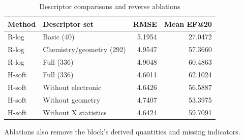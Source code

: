 \par
\begin{table}[H]
\centering
\begin{threeparttable}
\caption{Descriptor comparisons and reverse ablations}\label{tab:features}
\begin{tabularx}{\linewidth}{@{}l X r r@{}}
\toprule
Method & Descriptor set & RMSE & Mean EF@20\\
\midrule
R-log & Basic (40) & 5.1954 & 27.0472\\
R-log & Chemistry/geometry (292) & 4.9547 & 57.3660\\
R-log & Full (336) & 4.9048 & 60.4863\\
H-soft & Full (336) & 4.6011 & 62.1024\\
H-soft & Without electronic & 4.6426 & 56.5887\\
H-soft & Without geometry & 4.7407 & 53.3975\\
H-soft & Without X statistics & 4.6424 & 59.7091\\
\bottomrule
\end{tabularx}
\begin{tablenotes}[flushleft]
\item[] Ablations also remove the block's derived quantities and missing indicators.
\end{tablenotes}
\end{threeparttable}
\end{table}
\par
